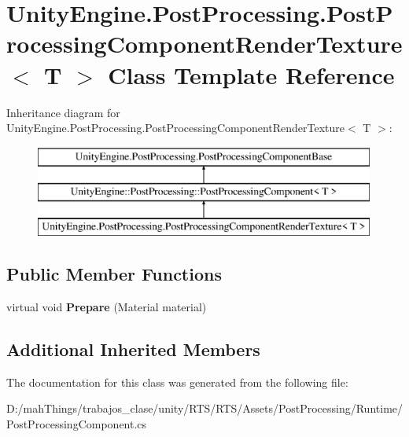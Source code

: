 \hypertarget{class_unity_engine_1_1_post_processing_1_1_post_processing_component_render_texture}{}\section{Unity\+Engine.\+Post\+Processing.\+Post\+Processing\+Component\+Render\+Texture$<$ T $>$ Class Template Reference}
\label{class_unity_engine_1_1_post_processing_1_1_post_processing_component_render_texture}
Inheritance diagram for Unity\+Engine.\+Post\+Processing.\+Post\+Processing\+Component\+Render\+Texture$<$ T $>$\+:\begin{figure}[H]
\begin{center}
\leavevmode
\includegraphics[height=3.000000cm]{class_unity_engine_1_1_post_processing_1_1_post_processing_component_render_texture}
\end{center}
\end{figure}
\subsection*{Public Member Functions}
\begin{DoxyCompactItemize}
\item 
\mbox{\label{class_unity_engine_1_1_post_processing_1_1_post_processing_component_render_texture_adcf0697959b318bf65a96ce47ee26732}} 
virtual void {\bfseries Prepare} (Material material)
\end{DoxyCompactItemize}
\subsection*{Additional Inherited Members}


The documentation for this class was generated from the following file\+:\begin{DoxyCompactItemize}
\item 
D\+:/mah\+Things/trabajos\+\_\+clase/unity/\+R\+T\+S/\+R\+T\+S/\+Assets/\+Post\+Processing/\+Runtime/Post\+Processing\+Component.\+cs\end{DoxyCompactItemize}
